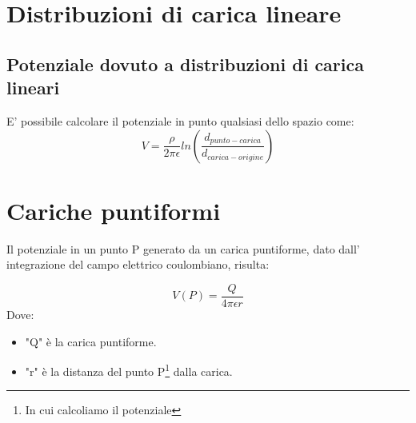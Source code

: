 	\section{Distribuzioni di carica lineare}

		\subsection{Potenziale dovuto a distribuzioni di carica lineari}
		E' possibile calcolare il potenziale in punto qualsiasi dello spazio come: 
		\begin{equation}
		V=\frac{\rho}{2\pi \epsilon}ln(\frac{d_{punto-carica}}{d_{carica-origine}})
		\label{eq:potenzialecaricalineare}
		\end{equation}

	\section{Cariche puntiformi}

		Il potenziale in un punto P generato da un carica puntiforme, dato dall' integrazione del campo elettrico coulombiano, risulta:

		\begin{equation}
		V(P)=\frac{Q}{4\pi \epsilon r}
		\label{eq:potenzialecaricapuntiforme}
		\end{equation}
		Dove:
		\begin{itemize}
		\item "Q" è la carica puntiforme.

		\item "r" è la distanza del punto P\footnote{In cui calcoliamo il potenziale} dalla carica.
		\end{itemize}
